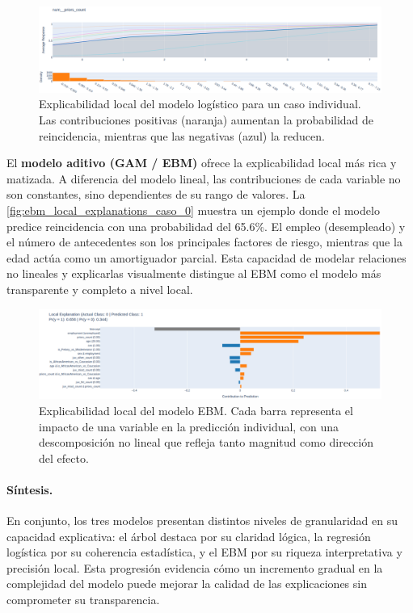 \begin{figure}[h]
  \centering
  \includegraphics[width=0.85\linewidth]{figures/logistic_local_contributions_caso_5.png}
  \caption{Explicabilidad local del modelo logístico para un caso individual. 
  Las contribuciones positivas (naranja) aumentan la probabilidad de reincidencia, mientras que las negativas (azul) la reducen.}
  \label{fig:logistic_local_contributions_caso_5}
\end{figure}

El \textbf{modelo aditivo (GAM / EBM)} ofrece la explicabilidad local más rica y matizada. 
A diferencia del modelo lineal, las contribuciones de cada variable no son constantes, sino dependientes de su rango de valores. 
La \autoref{fig:ebm_local_explanations_caso_0} muestra un ejemplo donde el modelo predice reincidencia con una probabilidad del 65.6\%. 
El empleo (desempleado) y el número de antecedentes son los principales factores de riesgo, mientras que la edad actúa como un amortiguador parcial. 
Esta capacidad de modelar relaciones no lineales y explicarlas visualmente distingue al EBM como el modelo más transparente y completo a nivel local.

\begin{figure}[h]
  \centering
  \includegraphics[width=0.9\linewidth]{figures/ebm_local_explanations_caso_0.png}
  \caption{Explicabilidad local del modelo EBM. 
  Cada barra representa el impacto de una variable en la predicción individual, con una descomposición no lineal que refleja tanto magnitud como dirección del efecto.}
  \label{fig:ebm_local_explanations_caso_0}
\end{figure}

\paragraph{Síntesis.}
En conjunto, los tres modelos presentan distintos niveles de granularidad en su capacidad explicativa:
el árbol destaca por su claridad lógica, la regresión logística por su coherencia estadística, y el EBM por su riqueza interpretativa y precisión local. 
Esta progresión evidencia cómo un incremento gradual en la complejidad del modelo puede mejorar la calidad de las explicaciones sin comprometer su transparencia.



